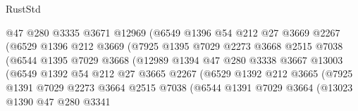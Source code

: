 \begin{lexlean}{RustStd}
\begin{coremodule}
                            @47
                            @280
                            @3335
                            @3671
                            @12969
                            (@6549
                              @1396
                              @54
                              @212
                              @27
                              @3669
                              @2267
                              (@6529
                                @1396
                                @212
                                @3669
                                (@7925
                                  @1395
                                  @7029
                                  @2273
                                  @3668
                                  @2515
                                  @7038
                                  (@6544
                                    @1395
                                    @7029
                                    @3668
                                    (@12989
                                      @1394
                                      @47
                                      @280
                                      @3338
                                      @3667
                                      @13003
                                      (@6549
                                        @1392
                                        @54
                                        @212
                                        @27
                                        @3665
                                        @2267
                                        (@6529
                                          @1392
                                          @212
                                          @3665
                                          (@7925
                                            @1391
                                            @7029
                                            @2273
                                            @3664
                                            @2515
                                            @7038
                                            (@6544
                                              @1391
                                              @7029
                                              @3664
                                              (@13023
                                                @1390
                                                @47
                                                @280
                                                @3341

\end{coremodule}
\end{lexlean}
